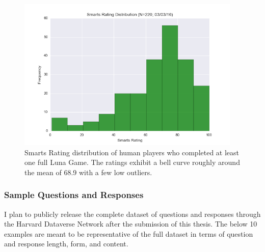 
\begin{figure}
\includegraphics[width=0.95\textwidth]{figures/ratingDistribution.png}
\caption{\label{humansmartsratings} Smarts Rating distribution of human players who completed at least one full Luna Game. The ratings exhibit a bell curve roughly around the mean of 68.9 with a few low outliers.}
\end{figure}

\subsubsection{Sample Questions and Responses}

I plan to publicly release the complete dataset of questions and responses through the Harvard Dataverse Network after the submission of this thesis. The below 10 examples are meant to be representative of the full dataset in terms of question and response length, form, and content.

